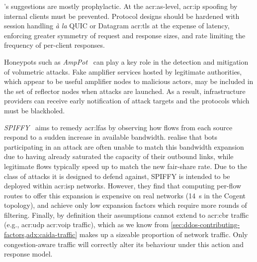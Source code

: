 \textcite{DBLP:conf/ndss/Rossow14}'s suggestions are mostly prophylactic.
At the \gls{acr:as}-level, \gls{acr:ip} spoofing by internal clients must be prevented.
Protocol designs should be hardened with session handling \emph{\`{a} la} QUIC or Datagram \gls{acr:tls} at the expense of latency, enforcing greater symmetry of request and response sizes, and rate limiting the frequency of per-client responses.

Honeypots such as \emph{AmpPot}~\parencite{DBLP:conf/raid/KramerKMNKYR15} can play a key role in the detection and mitigation of volumetric attacks.
Fake amplifier services hosted by legitimate authorities, which appear to be useful amplifier nodes to malicious actors, may be included in the set of reflector nodes when attacks are launched.
As a result, infrastructure providers can receive early notification of attack targets and the protocols which must be blackholed.

\emph{SPIFFY}~\parencite{DBLP:conf/ndss/KangGS16} aims to remedy \glspl{acr:lfa} by observing how flows from each source respond to a sudden increase in available bandwidth.
 realise that bots participating in an attack are often unable to match this bandwidth expansion due to having already saturated the capacity of their outbound links, while legitimate flows typically speed up to match the new fair-share rate.
Due to the class of attacks it is designed to defend against, SPIFFY is intended to be deployed within \gls{acr:isp} networks.
However, they find that computing per-flow routes to offer this expansion is expensive on real networks (\qty{14}{\second} in the Cogent topology), and achieve only low expansion factors which require more rounds of filtering.
Finally, by definition their assumptions cannot extend to \gls{acr:cbr} traffic (e.g., \gls{acr:udp} \gls{acr:voip} traffic), which as we know from \cref{sec:ddos-contributing-factors,adx:caida-traffic} makes up a sizeable proportion of network traffic.
Only congestion-aware traffic will correctly alter its behaviour under this action and response model.


